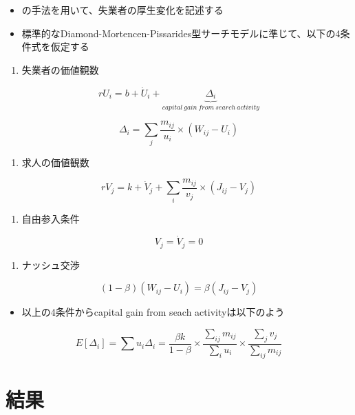 \documentclass[
]{book}
\providecommand{\tightlist}{%
  \setlength{\itemsep}{0pt}\setlength{\parskip}{0pt}}
\begin{document}
\begin{itemize}
\item
  \citet{kawata2021welfare} の手法を用いて、失業者の厚生変化を記述する
\item
  標準的なDiamond-Mortencen-Pissarides型サーチモデル\citep{rogerson2005search}に準じて、以下の4条件式を仮定する
\end{itemize}

\begin{enumerate}
\def\labelenumi{\arabic{enumi}.}
\tightlist
\item
  失業者の価値観数
\end{enumerate}

\[rU_i=b+\dot{U}_i+\underbrace{\Delta_i}_{capital\ gain\ from\ search\ activity}\]

\[\Delta_i = \sum_j\frac{m_{ij}}{u_i}\times (W_{ij}-U_i)\]

\begin{enumerate}
\def\labelenumi{\arabic{enumi}.}
\setcounter{enumi}{1}
\tightlist
\item
  求人の価値観数
\end{enumerate}

\[rV_j=k+\dot{V}_j+\sum_{i}\frac{m_{ij}}{v_j}\times (J_{ij}-V_j)\]

\begin{enumerate}
\def\labelenumi{\arabic{enumi}.}
\setcounter{enumi}{2}
\tightlist
\item
  自由参入条件
\end{enumerate}

\[V_j=\dot{V}_j=0\]

\begin{enumerate}
\def\labelenumi{\arabic{enumi}.}
\setcounter{enumi}{3}
\tightlist
\item
  ナッシュ交渉
\end{enumerate}

\[(1-\beta)(W_{ij}-U_i)=\beta(J_{ij}-V_j)\]

\begin{itemize}
\tightlist
\item
  以上の4条件からcapital gain from seach activityは以下のよう
\end{itemize}

\[E[\Delta_i]=\sum u_i\Delta_i=\frac{\beta k}{1-\beta}\times\frac{\sum_{ij}m_{ij}}{\sum_i u_i}\times \frac{\sum_{j}v_j}{\sum_{ij}m_{ij}}\]

\hypertarget{ux7d50ux679c}{%
\section{結果}\label{ux7d50ux679c}}
\end{document}
